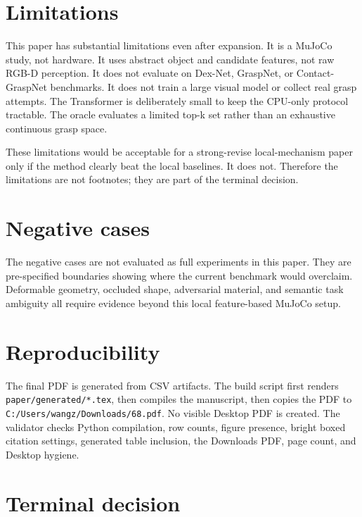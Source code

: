 \documentclass{article}
\begin{document}
\section{Limitations}

This paper has substantial limitations even after expansion.
It is a MuJoCo study, not hardware.
It uses abstract object and candidate features, not raw RGB-D perception.
It does not evaluate on Dex-Net, GraspNet, or Contact-GraspNet benchmarks.
It does not train a large visual model or collect real grasp attempts.
The Transformer is deliberately small to keep the CPU-only protocol tractable.
The oracle evaluates a limited top-k set rather than an exhaustive continuous grasp space.

These limitations would be acceptable for a strong-revise local-mechanism paper only if the method clearly beat the local baselines.
It does not.
Therefore the limitations are not footnotes; they are part of the terminal decision.

\section{Negative cases}



The negative cases are not evaluated as full experiments in this paper.
They are pre-specified boundaries showing where the current benchmark would overclaim.
Deformable geometry, occluded shape, adversarial material, and semantic task ambiguity all require evidence beyond this local feature-based MuJoCo setup.

\section{Reproducibility}

The final PDF is generated from CSV artifacts.
The build script first renders \texttt{paper/generated/*.tex}, then compiles the manuscript, then copies the PDF to \texttt{C:/Users/wangz/Downloads/68.pdf}.
No visible Desktop PDF is created.
The validator checks Python compilation, row counts, figure presence, bright boxed citation settings, generated table inclusion, the Downloads PDF, page count, and Desktop hygiene.

\section{Terminal decision}
\end{document}
